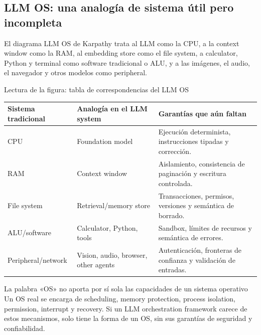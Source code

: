 
\subsection{LLM OS: una analogía de sistema útil pero incompleta}

El diagrama LLM OS de Karpathy trata al LLM como la CPU, a la context window como la RAM, al embedding store como el file system, a calculator, Python y terminal como software tradicional o ALU, y a las imágenes, el audio, el navegador y otros modelos como peripheral.


\begin{knowledgebox}{Lectura de la figura: tabla de correspondencias del LLM OS}
\begin{tabularx}{\textwidth}{L{0.22\textwidth} L{0.24\textwidth} X}
\toprule
Sistema tradicional & Analogía en el LLM system & Garantías que aún faltan \\
\midrule
CPU & Foundation model & Ejecución determinista, instrucciones tipadas y corrección. \\
RAM & Context window & Aislamiento, consistencia de paginación y escritura controlada. \\
File system & Retrieval/memory store & Transacciones, permisos, versiones y semántica de borrado. \\
ALU/software & Calculator, Python, tools & Sandbox, límites de recursos y semántica de errores. \\
Peripheral/network & Vision, audio, browser, other agents & Autenticación, fronteras de confianza y validación de entradas. \\
\bottomrule
\end{tabularx}
\end{knowledgebox}

\begin{warningbox}{La palabra «OS» no aporta por sí sola las capacidades de un sistema operativo}
Un OS real se encarga de scheduling, memory protection, process isolation, permission, interrupt y recovery. Si un LLM orchestration framework carece de estos mecanismos, solo tiene la forma de un OS, sin sus garantías de seguridad y confiabilidad.
\end{warningbox}

